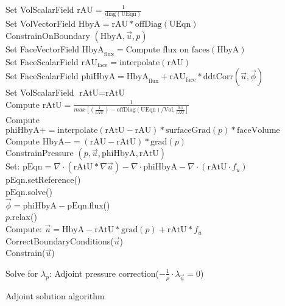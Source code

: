 \documentclass[10pt]{article} %
\begin{document}
\begin{center}
\begin{algorithm}[H]
{{{				Set VolScalarField $\text{rAU} =  \frac{1}{\text{diag}(\text{UEqn})}$\\
				Set VolVectorField $\text{HbyA} =  \text{rAU}*\text{offDiag}(\text{UEqn})$\\
				ConstrainOnBoundary $(\text{HbyA},\vec{u},p)$\\
				\quad Set FaceVectorField $\text{HbyA}_{\text{flux}} =  \text{Compute flux on faces}(\text{HbyA})$\\
				\quad Set FaceScalarField $\text{rAU}_{\text{face}} =  \text{interpolate}(\text{rAU})$\\
				Set FaceScalarField $\text{phiHbyA} = \text{HbyA}_{\text{flux}} + \text{rAU}_{\text{face}}*\text{ddtCorr}(\vec{u},\vec{\phi}) $\\
				Set VolScalarField $\text{rAtU} = \text{rAtU}$\\
				{
					Compute $\text{rAtU} =  \frac{1}{max\left[(\frac{1}{\text{rAU}}) - \text{offDiag}(\text{UEqn})/\text{Vol} , \frac{0.1}{\text{rAU}}\right]} $\\
					Compute $\text{phiHbyA} += \text{interpolate}(\text{rAtU}-\text{rAU})*\text{surfaceGrad}(p)*\text{faceVolume}$\\
					Compute $\text{HbyA} -=  \left(\text{rAU}-\text{rAtU}\right)*\text{grad}(p)$\\
				}
				ConstrainPressure $(p,\vec{u},\text{phiHbyA},\text{rAtU})$\\
				{
					Set: $\text{pEqn} = \nabla \cdot \left(\text{rAtU} * \nabla \vec{u}\right)-\nabla \cdot \text{phiHbyA} - \nabla \cdot \left(\text{rAtU} \cdot f_u\right)$\\
					$\text{pEqn}.$setReference()\\
					$\text{pEqn}.$solve()\\
				}
				{
					$\vec{\phi} = \text{phiHbyA} - \text{pEqn}$.flux()\\
				}
				$p.$relax()\\
				Compute: $\vec{u} = \text{HbyA} - \text{rAtU}*\text{grad}(p) + \text{rAtU}*f_u$\\
				CorrectBoundaryConditions($\vec{u}$)\\
				Constrain($\vec{u}$)
			}
			
			Solve for $\lambda_p$: Adjoint pressure correction($-\frac{1}{\rho} \cdot \lambda_{\vec{u}}=0$)\\
		}
	}
	\caption{Adjoint solution algorithm}
\end{algorithm}
\newpage
	

\end{center}
\end{document}
